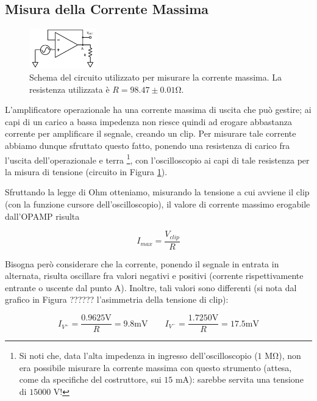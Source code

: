 \subsection{Misura della Corrente Massima}

\begin{figure}
  \begin{center}
    \includegraphics[width=0.26\textwidth]{../E03/latex/max_current.pdf}
  \end{center}
  \caption{Schema del circuito utilizzato per misurare la corrente massima. La resistenza utilizzata è $R=98.47\pm0.01$\si{\ohm}.}
  \label{cir3:max_current}
\end{figure}

L'amplificatore operazionale ha una corrente massima di uscita che può gestire; ai capi di un carico a bassa impedenza non riesce quindi ad erogare abbastanza corrente per amplificare il segnale, creando un clip. Per misurare tale corrente abbiamo dunque sfruttato questo fatto, ponendo una resistenza di carico fra l'uscita dell'operazionale e terra \footnote{Si noti che, data l'alta impedenza in ingresso dell'oscilloscopio ($1$ \si{\mega\ohm}), non era possibile misurare la corrente massima con questo strumento (attesa, come da specifiche del costruttore, sui $15$ \si{\milli\ampere}): sarebbe servita una tensione di $15000$ \si{\volt}!}, con l'oscilloscopio ai capi di tale resistenza per la misura di tensione (circuito in Figura \ref{cir3:max_current}).

Sfruttando la legge di Ohm otteniamo, misurando la tensione a cui avviene il clip (con la funzione cursore dell'oscilloscopio), il valore di corrente massimo erogabile dall'OPAMP risulta

$$I_{max} = \frac{V_{clip}}{R}$$

Bisogna però considerare che la corrente, ponendo il segnale in entrata in alternata, risulta oscillare fra valori negativi e positivi (corrente rispettivamente entrante o uscente dal punto A). Inoltre, tali valori sono differenti (si nota dal grafico in Figura ?????? l'asimmetria della tensione di clip):

$$I_{V^+} = \frac{0.9625 \si{\volt}}{R} = 9.8 \si{\milli\volt}  \qquad I_{V^-} = \frac{1.7250 \si{\volt}}{R} = 17.5 \si{\milli\volt}$$